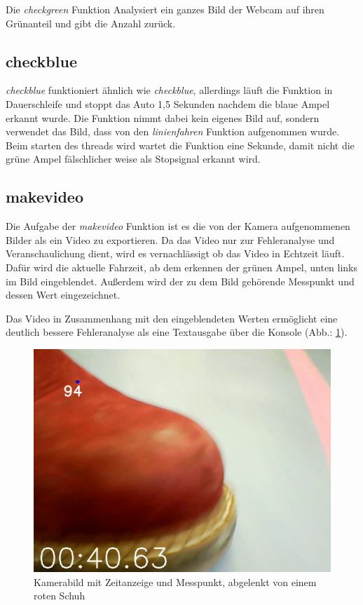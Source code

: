 \documentclass[a4paper, 12pt]{scrartcl}
\begin{document}
Die \textit{checkgreen} Funktion Analysiert ein ganzes Bild der Webcam auf ihren Grünanteil und gibt die Anzahl zurück.

\subsection{checkblue}	%


\textit{checkblue} funktioniert ähnlich wie \textit{checkblue}, allerdings läuft die Funktion in Dauerschleife und stoppt das Auto 1,5 Sekunden nachdem die blaue Ampel erkannt wurde.
Die Funktion nimmt dabei kein eigenes Bild auf, sondern verwendet das Bild, dass von den \textit{linienfahren} Funktion aufgenommen wurde. Beim starten des threads wird wartet die Funktion eine Sekunde, damit nicht die grüne Ampel fälschlicher weise als Stopsignal erkannt wird.

\subsection{makevideo}	%


Die Aufgabe der \textit{makevideo} Funktion ist es die von der Kamera aufgenommenen Bilder als ein Video zu exportieren. Da das Video nur zur Fehleranalyse und Veranschaulichung dient, wird es vernachlässigt ob das Video in Echtzeit läuft. Dafür wird die aktuelle Fahrzeit, ab dem erkennen der grünen Ampel, unten links im Bild eingeblendet. Außerdem wird der zu dem Bild gehörende Messpunkt und dessen Wert eingezeichnet.

Das Video in Zusammenhang mit den eingeblendeten Werten ermöglicht eine deutlich bessere Fehleranalyse als eine Textausgabe über die Konsole (Abb.: \ref{schuh_im_bild}).

\begin{figure}[ht!] \centering
	\includegraphics[width=.5\textwidth]{schuh_im_bild.png}
	\caption{Kamerabild mit Zeitanzeige und Messpunkt, abgelenkt von einem roten Schuh}
	\label{schuh_im_bild}
\end{figure}
\end{document}
